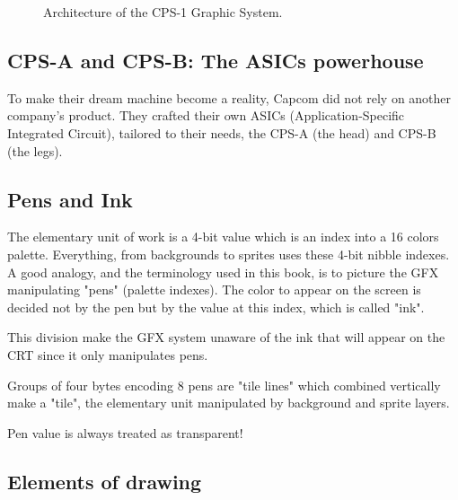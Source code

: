 \begin{figure}[H]
\caption*{Architecture of the CPS-1 Graphic System.}
\end{figure}


\subsection{CPS-A and CPS-B: The ASICs powerhouse}
To make their dream machine become a reality, Capcom did not rely on another company's product. They crafted their own ASICs (Application-Specific Integrated Circuit), tailored to their needs, the CPS-A (the head) and CPS-B (the legs).








\subsection{Pens and Ink}
The elementary unit of work is a 4-bit value which is an index into a 16 colors palette. Everything, from backgrounds to sprites uses these 4-bit nibble indexes. A good analogy, and the terminology used in this book, is to picture the GFX manipulating "pens" (palette indexes). The color to appear on the screen is decided not by the pen but by the value at this index, which is called "ink".

This division make the GFX system unaware of the ink that will appear on the CRT since it only manipulates pens.





Groups of four bytes encoding 8 pens are "tile lines" which combined vertically make a "tile", the elementary unit manipulated by background and sprite layers.


 \begin{trivia}
 Pen value  is always treated as transparent!
 \end{trivia}



\subsection{Elements of drawing}

